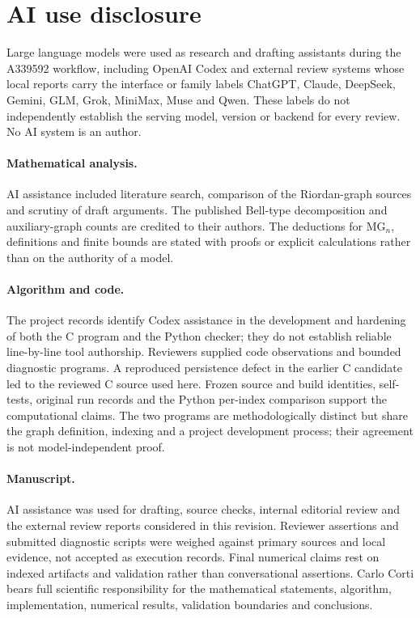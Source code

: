 \documentclass[11pt,a4paper]{article}
\newcommand{\MG}{\mathrm{MG}}
\begin{document}
\section*{AI use disclosure}
Large language models were used as research and drafting assistants during
the A339592 workflow, including OpenAI Codex and external review systems
whose local reports carry the interface or family labels ChatGPT, Claude,
DeepSeek, Gemini, GLM, Grok, MiniMax, Muse and Qwen.  These labels do not
independently establish the serving model, version or backend for every
review.  No AI system is an author.

\paragraph{Mathematical analysis.} AI assistance included literature
search, comparison of the Riordan-graph sources and scrutiny of draft
arguments.  The published Bell-type decomposition and auxiliary-graph
counts are credited to their authors.  The deductions for $\MG_n$,
definitions and finite bounds are stated with proofs or explicit
calculations rather than on the authority of a model.

\paragraph{Algorithm and code.} The project records identify Codex
assistance in the development and hardening of both the C program and the
Python checker; they do not establish reliable line-by-line tool authorship.
Reviewers supplied code observations and bounded diagnostic programs.
A reproduced persistence defect in the earlier C candidate led to the
reviewed C source used here.  Frozen source and build identities,
self-tests, original run records and the Python per-index comparison
support the computational claims.  The two programs are methodologically
distinct but share the graph definition, indexing and a project
development process; their agreement is not model-independent proof.

\paragraph{Manuscript.} AI assistance was used for drafting, source checks,
internal editorial review and the external review reports considered in
this revision.  Reviewer assertions and submitted diagnostic scripts were
weighed against primary sources and local evidence, not accepted as
execution records.  Final numerical claims rest on indexed artifacts and
validation rather than conversational assertions.
Carlo Corti bears full scientific responsibility for the mathematical
statements, algorithm, implementation, numerical results, validation
boundaries and conclusions.
\end{document}
